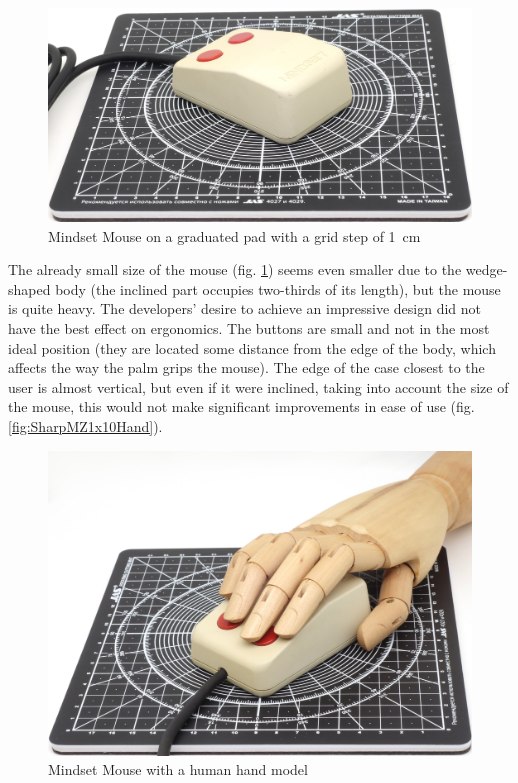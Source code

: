 \documentclass[11pt, a4paper]{article}
\begin{document}
\begin{figure}[h]
    \centering
    \includegraphics[scale=0.5]{1984_mindset_mouse/size_15.jpg}
    \caption{Mindset Mouse on a graduated pad with a grid step of 1~cm}
    \label{fig:MindsetMouseSize}
\end{figure}

The already small size of the mouse (fig. \ref{fig:MindsetMouseSize}) seems even smaller due to the wedge-shaped body (the inclined part occupies two-thirds of its length), but the mouse is quite heavy. The developers' desire to achieve an impressive design did not have the best effect on ergonomics. The buttons are small and not in the most ideal position (they are located some distance from the edge of the body, which affects the way the palm grips the mouse). The edge of the case closest to the user is almost vertical, but even if it were inclined, taking into account the size of the mouse, this would not make significant improvements in ease of use (fig. \ref{fig:SharpMZ1x10Hand}).

\begin{figure}[h]
    \centering
    \includegraphics[scale=0.5]{1984_mindset_mouse/hand_30.jpg}
    \caption{Mindset Mouse with a human hand model}
    \label{fig:MindsetMouseHand}
\end{figure}
\end{document}
